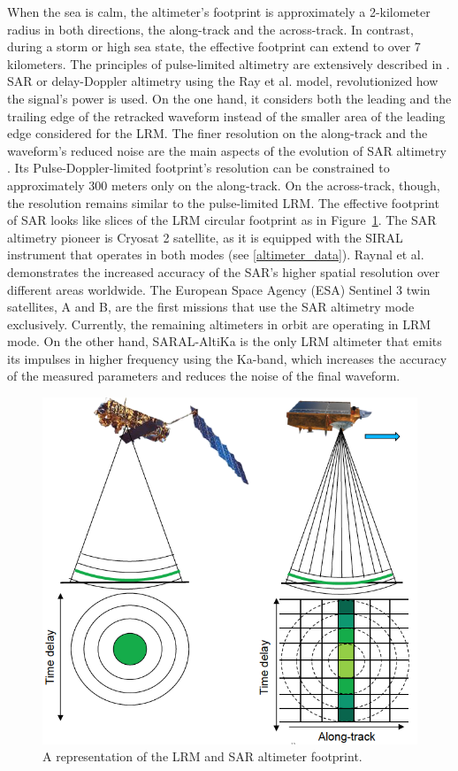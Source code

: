 When the sea is calm, the altimeter's footprint is approximately a 2-kilometer radius in both directions, the along-track and the across-track. In contrast, during a storm or high sea state, the effective footprint can extend to over 7 kilometers. The principles of pulse-limited altimetry are extensively described in \cite{Chelton2001}. SAR or delay-Doppler altimetry using the Ray et al. \cite{Ray2015SARModel} model, revolutionized how the signal's power is used. On the one hand, it considers both the leading and the trailing edge of the retracked waveform instead of the smaller area of the leading edge considered for the LRM. The finer resolution on the along-track and the waveform's reduced noise are the main aspects of the evolution of SAR altimetry \cite{KeithRaney1998}. Its Pulse-Doppler-limited footprint's resolution can be constrained to approximately 300 meters only on the along-track. On the across-track, though, the resolution remains similar to the pulse-limited LRM. The effective footprint of SAR looks like slices of the LRM circular footprint as in Figure~\ref{fig:SAR_LRM}. The SAR altimetry pioneer is Cryosat 2 satellite, as it is equipped with the SIRAL instrument that operates in both modes (see \ref{altimeter_data}). Raynal et al. \cite{Raynal2018} demonstrates the increased accuracy of the SAR's higher spatial resolution over different areas worldwide. The European Space Agency (ESA) Sentinel 3 twin satellites, A and B, are the first missions that use the SAR altimetry mode exclusively. Currently, the remaining altimeters in orbit are operating in LRM mode. On the other hand, SARAL-AltiKa is the only LRM altimeter that emits its impulses in higher frequency using the Ka-band, which increases the accuracy of the measured parameters and reduces the noise of the final waveform.


 
\begin{figure}[H]
\centering
\includegraphics[width=0.8\linewidth]{Figures/Chapter2/sar_vs_lrm.png}
\caption{A representation of the LRM and SAR altimeter footprint.}
\label{fig:SAR_LRM}
\end{figure}



